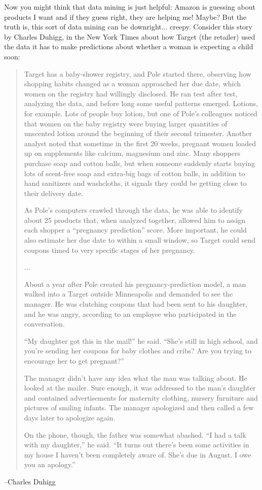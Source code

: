 \documentclass[a4paper]{report}
\begin{document}
Now you might think that data mining is just helpful: Amazon is guessing about products I want and if they guess right, they are helping me! Maybe? But the truth is, this sort of data mining can be downright... creepy. Consider this story by Charles Duhigg, in the New York Times about how Target (the retailer) used the data it has to make predictions about whether a woman is expecting a child soon: 

\begin{quote}
Target has a baby-shower registry, and Pole started there, observing how shopping habits changed as a woman approached her due date, which women on the registry had willingly disclosed. He ran test after test, analyzing the data, and before long some useful patterns emerged. Lotions, for example. Lots of people buy lotion, but one of Pole's colleagues noticed that women on the baby registry were buying larger quantities of unscented lotion around the beginning of their second trimester. Another analyst noted that sometime in the first 20 weeks, pregnant women loaded up on supplements like calcium, magnesium and zinc. Many shoppers purchase soap and cotton balls, but when someone suddenly starts buying lots of scent-free soap and extra-big bags of cotton balls, in addition to hand sanitizers and washcloths, it signals they could be getting close to their delivery date.

As Pole's computers crawled through the data, he was able to identify about 25 products that, when analyzed together, allowed him to assign each shopper a ``pregnancy prediction'' score. More important, he could also estimate her due date to within a small window, so Target could send coupons timed to very specific stages of her pregnancy.

...


About a year after Pole created his pregnancy-prediction model, a man walked into a Target outside Minneapolis and demanded to see the manager. He was clutching coupons that had been sent to his daughter, and he was angry, according to an employee who participated in the conversation.

``My daughter got this in the mail!'' he said. ``She's still in high school, and you're sending her coupons for baby clothes and cribs? Are you trying to encourage her to get pregnant?''

The manager didn't have any idea what the man was talking about. He looked at the mailer. Sure enough, it was addressed to the man's daughter and contained advertisements for maternity clothing, nursery furniture and pictures of smiling infants. The manager apologized and then called a few days later to apologize again.

On the phone, though, the father was somewhat abashed. ``I had a talk with my daughter,'' he said. ``It turns out there's been some activities in my house I haven't been completely aware of. She's due in August. I owe you an apology.''
\end{quote}
\hfill --Charles Duhigg~\cite{targetdata}
\end{document}
